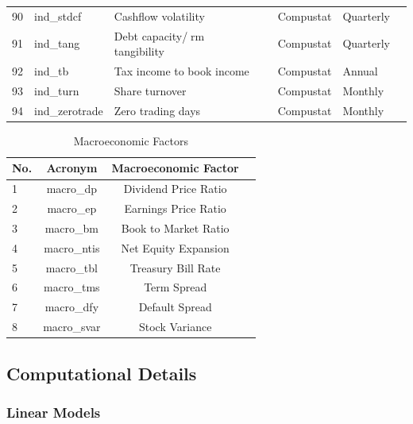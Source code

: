 \documentclass[a4paper, table]{article}
\begin{document}
\begin{landscape}
\begin{center}
\begin{longtable}{lllllll}
			90 & ind\_stdcf\footnotemark[\value{footnote}] & Cashflow volatility & 
				\cite{huang_cross_2009} & Compustat & Quarterly \\
			91 & ind\_tang & Debt capacity/rm tangibility & 
				\cite{almeida_financial_2007} & Compustat & Quarterly \\
			92 & ind\_tb\footnotemark[\value{footnote}] & Tax income to book income & 
				\cite{lev_market-based_1982} & Compustat & Annual \\
			93 & ind\_turn & Share turnover & 
				\cite{datar_liquidity_1998} & Compustat & Monthly \\
			94 & ind\_zerotrade & Zero trading days & 
				\cite{liu_liquidity-augmented_2006} & Compustat & Monthly \\ \hline	
		\end{longtable}
	\end{center}
\end{landscape}

\newpage


\begin{table}
	\caption{Macroeconomic Factors}
	\begin{center}
	\begin{tabular}{lccc} \hline
		No. & Acronym & Macroeconomic Factor \\ \hline
		1 & macro\_dp & Dividend Price Ratio \\
		2 & macro\_ep & Earnings Price Ratio \\
		3 & macro\_bm & Book to Market Ratio \\
		4 & macro\_ntis & Net Equity Expansion \\
		5 & macro\_tbl & Treasury Bill Rate \\
		6 & macro\_tms & Term Spread \\
		7 & macro\_dfy & Default Spread \\
		8 & macro\_svar & Stock Variance \\ \hline
	\end{tabular}
	\end{center}
\end{table}

\subsection{Computational Details}
\label{computation}

\subsubsection{Linear Models}
\end{document}
